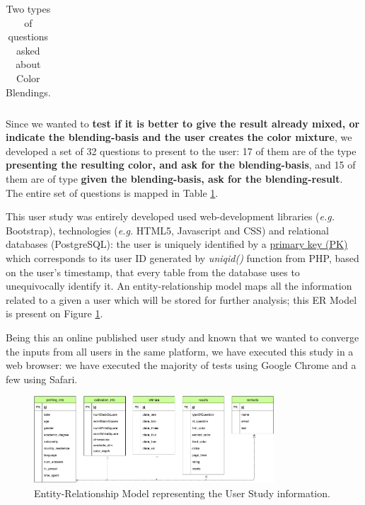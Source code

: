 \begin{table}[htbp]
{\begin{tabular}{ccc|c|ccccc}
	\end{tabular}}
  \caption[Two types of questions asked about Color Blendings.]{Two types of questions asked about Color Blendings.}
  \label{table:color_blendings}
\end{table}
%
Since we wanted to \textbf{test if it is better to give the result already mixed, or indicate the blending-basis and the user creates
the color mixture}, we developed a set of 32 questions to present to the user: 17 of them are of the type \textbf{presenting the resulting
color, and ask for the blending-basis}, and 15 of them are of type \textbf{given the blending-basis, ask for the blending-result}. The entire
set of questions is mapped in Table \ref{table:color_blendings}. \par
%
This user study was entirely developed used web-development libraries (\emph{e.g.} Bootstrap), technologies (\emph{e.g.} HTML5, Javascript
and CSS) and relational databases (PostgreSQL): the user is uniquely identified by a \ul{primary key (PK)} which corresponds to its user ID generated
by \emph{uniqid()} function from PHP, based on the user's timestamp, that every table from the database uses to unequivocally identify it.
An entity-relationship model maps all the information related to a given a user which will be stored for further analysis; this ER Model is present on
Figure \ref{fig:er_model}. \par
%
Being this an online published user study and known that we wanted to converge the inputs from all users in the same platform, we have executed this study
in a web browser: we have executed the majority of tests using Google Chrome and a few using Safari.
%
\begin{figure}[htbp]
	\centering
  \includegraphics[width=0.8\textwidth]{images/implementation/tables_schema.png}
  \caption[Entity-Relationship Model representing the User Study information.]{Entity-Relationship Model representing the User Study information.}
  \label{fig:er_model}
\end{figure}
%
%
